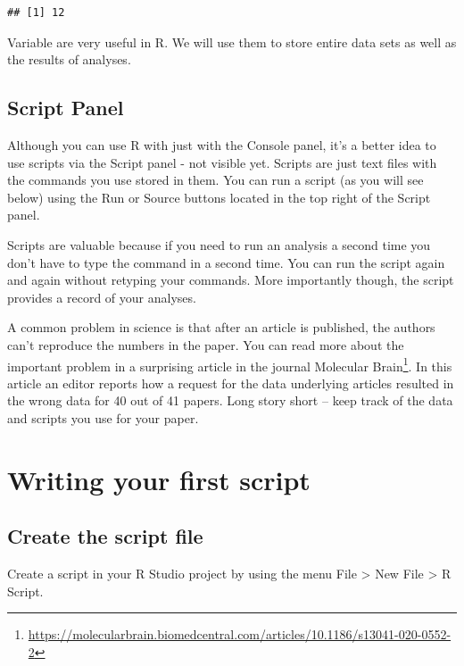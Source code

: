 \documentclass[
]{krantz}
\renewcommand{\href}[2]{#2\footnote{\url{#1}}}
\begin{document}
\begin{verbatim}
## [1] 12
\end{verbatim}

Variable are very useful in R. We will use them to store entire data sets as well as the results of analyses.

\hypertarget{script-panel}{%
\subsection{Script Panel}\label{script-panel}}

Although you can use R with just with the Console panel, it's a better idea to use scripts via the Script panel - not visible yet. Scripts are just text files with the commands you use stored in them. You can run a script (as you will see below) using the Run or Source buttons located in the top right of the Script panel.

Scripts are valuable because if you need to run an analysis a second time you don't have to type the command in a second time. You can run the script again and again without retyping your commands. More importantly though, the script provides a record of your analyses.

A common problem in science is that after an article is published, the authors can't reproduce the numbers in the paper. You can read more about the important problem in a surprising article in the journal \href{https://molecularbrain.biomedcentral.com/articles/10.1186/s13041-020-0552-2}{Molecular Brain}. In this article an editor reports how a request for the data underlying articles resulted in the wrong data for 40 out of 41 papers. Long story short -- keep track of the data and scripts you use for your paper.

\hypertarget{writing-your-first-script}{%
\section{Writing your first script}\label{writing-your-first-script}}

\hypertarget{create-the-script-file}{%
\subsection{Create the script file}\label{create-the-script-file}}

Create a script in your R Studio project by using the menu File \textgreater{} New File \textgreater{} R Script.
\end{document}
